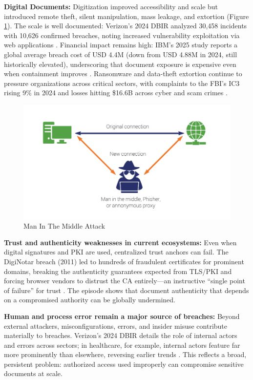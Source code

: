 \textbf{Digital Documents:} Digitization improved accessibility and scale but introduced remote theft, silent manipulation, mass leakage, and extortion (Figure \ref{man-in-the-middle}). The scale is well documented: Verizon’s 2024 DBIR analyzed 30,458 incidents with 10,626 confirmed breaches, noting increased vulnerability exploitation via web applications \cite{verizon_2024_nodate}. Financial impact remains high: IBM’s 2025 study reports a global average breach cost of USD 4.4M (down from USD 4.88M in 2024, still historically elevated), underscoring that document exposure is expensive even when containment improves \cite{ibm_cost_nodate,ibm_cost_nodate-1}. Ransomware and data-theft extortion continue to pressure organizations across critical sectors, with complaints to the FBI’s IC3 rising 9\% in 2024 and losses hitting \$16.6B across cyber and scam crimes \cite{reuters__fbi_complaints_nodate}.

\begin{figure}[H]
    \centering
    \includegraphics[width=18cm]{"images/man-in-the-middle.png"}
    \caption{Man In The Middle Attack}
    \label{man-in-the-middle}
\end{figure}

\textbf{Trust and authenticity weaknesses in current ecosystems:} Even when digital signatures and PKI are used, centralized trust anchors can fail. The DigiNotar breach (2011) led to hundreds of fraudulent certificates for prominent domains, breaking the authenticity guarantees expected from TLS/PKI and forcing browser vendors to distrust the CA entirely—an instructive “single point of failure” for trust \cite{wired_diginotar_nodate}. The episode shows that document authenticity that depends on a compromised authority can be globally undermined.

\textbf{Human and process error remain a major source of breaches:} Beyond external attackers, misconfigurations, errors, and insider misuse contribute materially to breaches. Verizon’s 2024 DBIR details the role of internal actors and errors across sectors; in healthcare, for example, internal actors feature far more prominently than elsewhere, reversing earlier trends \cite{hipaa_journal_verizon_nodate}. This reflects a broad, persistent problem: authorized access used improperly can compromise sensitive documents at scale.

